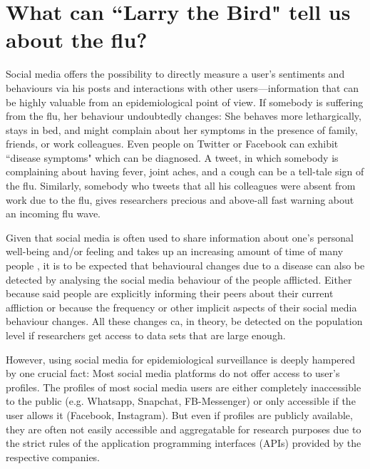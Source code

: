 \documentclass[11pt, a4paper,twoside]{report}\usepackage[]{graphicx}\usepackage[]{color}
\begin{document}
\section{What can ``Larry the Bird" tell us about the flu?}
Social media offers the possibility to directly measure a user's sentiments and behaviours via his posts and interactions with other users---information that can be highly valuable from an epidemiological point of view. If somebody is suffering from the flu, her behaviour undoubtedly changes: She behaves more lethargically, stays in bed, and might complain about her symptoms in the presence of family, friends, or work colleagues. Even people on Twitter or Facebook can exhibit ``disease symptoms" which can be diagnosed. A tweet, in which somebody is complaining about having fever, joint aches, and a cough can be a tell-tale sign of the flu. Similarly, somebody who tweets that all his colleagues were absent from work due to the flu, gives researchers precious and above-all fast warning about an incoming flu wave.

Given that social media is often used to share information about one's personal well-being and/or feeling and takes up an increasing amount of time of many people \citep{bauer_timeonline_2016,scott_time_2017,asano_socialmediatime_2017}, it is to be expected that behavioural changes due to a disease can also be detected by analysing the social media behaviour of the people afflicted. Either because said people are explicitly informing their peers about their current affliction or because the frequency or other implicit aspects of their social media behaviour changes. All these changes ca, in theory, be detected on the population level if researchers get access to data sets that are large enough.

However, using social media for epidemiological surveillance is deeply hampered by one crucial fact: Most social media platforms do not offer access to user's profiles. The profiles of most social media users are either completely inaccessible to the public (e.g. Whatsapp, Snapchat, FB-Messenger) or only accessible if the user allows it (Facebook, Instagram). But even if profiles are publicly available, they are often not easily accessible and aggregatable for research purposes due to the strict rules of the application programming interfaces (APIs) provided by the respective companies.
\end{document}
